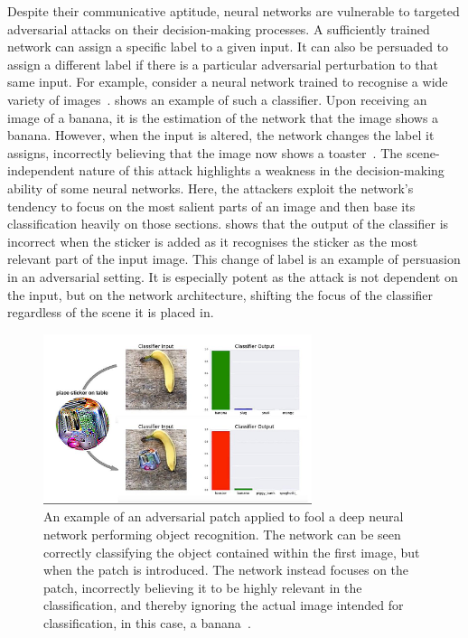 Despite their communicative aptitude, neural networks are vulnerable to targeted adversarial attacks on their decision-making processes. A sufficiently trained network can assign a specific label to a given input. It can also be persuaded to assign a different label if there is a particular adversarial perturbation to that same input. For example, consider a neural network trained to recognise a wide variety of images~\cite{Krizhevsky2012ImageNetNetworks}.  shows an example of such a classifier. Upon receiving an image of a banana, it is the estimation of the network that the image shows a banana. However, when the input is altered, the network changes the label it assigns, incorrectly believing that the image now shows a toaster~\cite{Goodfellow2014ExplainingExamples, Brown2017AdversarialPatch}. The scene-independent nature of this attack highlights a weakness in the decision-making ability of some neural networks. Here, the attackers exploit the network's tendency to focus on the most salient parts of an image and then base its classification heavily on those sections.  shows that the output of the classifier is incorrect when the sticker is added as it recognises the sticker as the most relevant part of the input image. This change of label is an example of persuasion in an adversarial setting. It is especially potent as the attack is not dependent on the input, but on the network architecture, shifting the focus of the classifier regardless of the scene it is placed in. 



\begin{figure}[ht]
    \centering
    \includegraphics[trim={0, 7mm, 0, 0}, clip, width=0.7\textwidth]{Images/Misc/AdversarialPatches.png}
    \caption{An example of an adversarial patch applied to fool a deep neural network performing object recognition. The network can be seen correctly classifying the object contained within the first image, but when the patch is introduced. The network instead focuses on the patch, incorrectly believing it to be highly relevant in the classification, and thereby ignoring the actual image intended for classification, in this case, a banana~\cite{Brown2017AdversarialPatch}. }
    \label{fig:adversarial_patch}
\end{figure}


